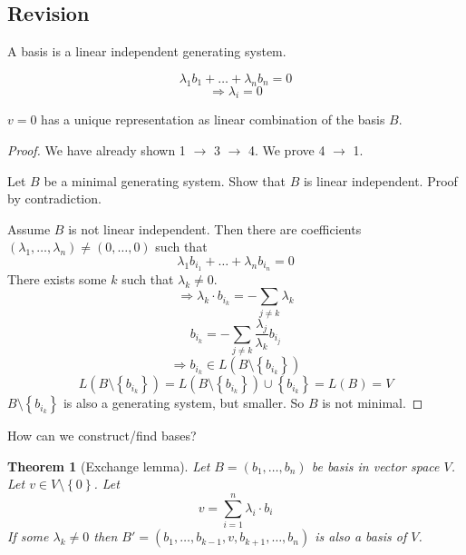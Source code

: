 \documentclass[a4paper,landscape,twocolumn]{article}
\newcommand\set[1]{\left\{#1\right\}}
\newtheorem{theorem}{Theorem}
\begin{document}
\subsection{Revision}

A basis is a linear independent generating system.

\[ \lambda_1 b_1 + \dots + \lambda_n b_n = 0 \]
\[ \Rightarrow \lambda_i = 0 \]

$v=0$ has a unique representation as linear combination of the basis $B$.


\begin{proof}
  We have already shown 1 $\rightarrow$ 3 $\rightarrow$ 4. We prove 4 $\rightarrow$ 1.

  Let $B$ be a minimal generating system. Show that $B$ is linear independent.
  Proof by contradiction.

  Assume $B$ is not linear independent.
  Then there are coefficients $(\lambda_1, \dots, \lambda_n) \neq (0, \dots, 0)$
  such that
  \[ \lambda_1 b_{i_1} + \dots + \lambda_n b_{i_n} = 0 \]
  There exists some $k$ such that $\lambda_k \neq 0$.
  \[ \Rightarrow \lambda_k \cdot b_{i_k} = -\sum_{j\neq k} \lambda_k \]
  \[ b_{i_k} = -\sum_{j\neq k} \frac{\lambda_j}{\lambda_k} b_{i_j} \]
  \[ \Rightarrow b_{i_k} \in L(B \setminus \set{b_{i_k}}) \]
  \[
    L(B \setminus \set{b_{i_k}})
    = L(B \setminus \set{b_{i_k}}) \cup \set{b_{i_k}}
    = L(B) = V
  \]
  $B \setminus \set{b_{i_k}}$ is also a generating system, but smaller.
  So $B$ is not minimal.
\end{proof}

How can we construct/find bases?

\begin{theorem}[Exchange lemma]
  \label{lemma-3-26}
  Let $B = (b_1, \ldots, b_n)$ be basis in vector space $V$.
  Let $v \in V \setminus \set{0}$.
  Let
  \[ v = \sum_{i=1}^n \lambda_i \cdot b_i \]
  If some $\lambda_k \neq 0$ then $B' = (b_1, \dots, b_{k-1}, v, b_{k+1}, \dots, b_n)$ is also a basis of $V$.
\end{theorem}
\end{document}
